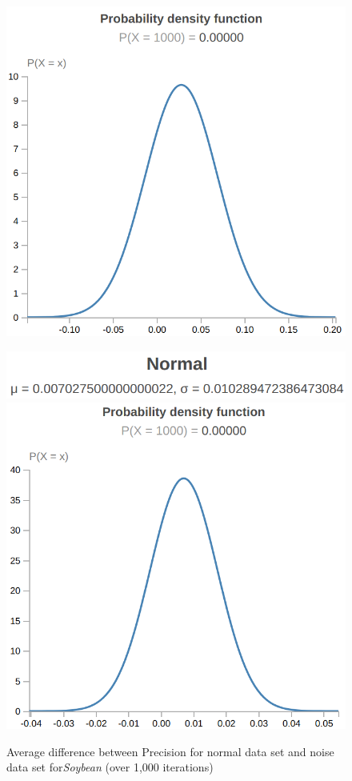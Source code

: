 \documentclass[twoside,11pt]{article}
\begin{document}
\begin{figure}[!hbp]
\begin{minipage}[b]{0.3\textwidth}
        \includegraphics[width=\textwidth]{soybean-l-df.png}
        \caption{Average difference between Precision for normal data set and noise data set for\emph{Soybean} (over 1,000 iterations)}
    \end{minipage}
    \hfill
    \begin{minipage}[b]{0.3\textwidth}
        \includegraphics[width=\textwidth]{soybean-r-ms.png}
        \includegraphics[width=\textwidth]{soybean-r-df.png}

\end{minipage}
\end{figure}
\end{document}
